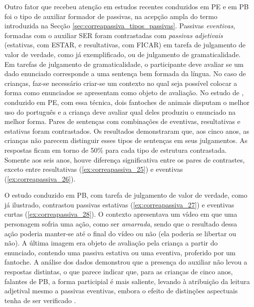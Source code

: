 \documentclass[output=paper]{LSP/langsci}
\begin{document}
Outro fator que recebeu atenção em estudos recentes conduzidos em PE e em PB foi o tipo de auxiliar formador de passivas, na acepção ampla do termo introduzida na Secção \ref{sec:correapassiva_tipos_passivas}. Passivas \textit{eventivas}, formadas com o auxiliar SER foram contrastadas com \textit{passivas adjetivais} (estativas, com ESTAR, e resultativas, com FICAR) em tarefa de julgamento de valor de verdade, como já exemplificado, ou de julgamento de gramaticalidade. Em tarefas de julgamento de gramaticalidade, o participante deve avaliar se um dado enunciado corresponde a uma sentença bem formada da língua. No caso de crianças, faz-se necessário criar-se um contexto no qual seja possível colocar a forma como enunciados se apresentam como objeto de avaliação. No estudo de \citet{estrela2013}, conduzido em PE, com essa técnica, dois fantoches de animais disputam o melhor uso do português e a criança deve avaliar qual deles produziu o enunciado na melhor forma. Pares de sentenças com combinações de eventivas, resultativas e estativas foram contrastados. Os resultados demonstraram que, aos cinco anos, as crianças não parecem distinguir esses tipos de sentenças em seus julgamentos. As respostas ficam em torno de 50\% para cada tipo de estrutura contrastada. Somente aos seis anos, houve diferença significativa entre os pares de contrastes, exceto entre resultativas (\ref{ex:correapassiva_25}) e eventivas (\ref{ex:correapassiva_26}).

\z
{}
\z

O estudo conduzido em PB, com tarefa de julgamento de valor de verdade, como já ilustrado, contrastou passivas estativas (\ref{ex:correapassiva_27}) e eventivas curtas (\ref{ex:correapassiva_28}). O contexto apresentava um vídeo em que uma personagem sofria uma ação, como ser \textit{amarrada}, sendo que o resultado dessa ação poderia manter-se até o final do vídeo ou não (ela poderia se libertar ou não). A última imagem era objeto de avaliação pela criança a partir do enunciado, contendo uma passiva estativa ou uma eventiva, proferido por um fantoche. A análise dos dados demonstrou que a presença do auxiliar não levou a respostas distintas, o que parece indicar que, para as crianças de cinco anos, falantes de PB, a forma participial é mais saliente, levando à atribuição da leitura adjetival mesmo a passivas eventivas, embora o efeito de distinções aspectuais tenha de ser verificado \citep{limajunior2012}. 
\end{document}
